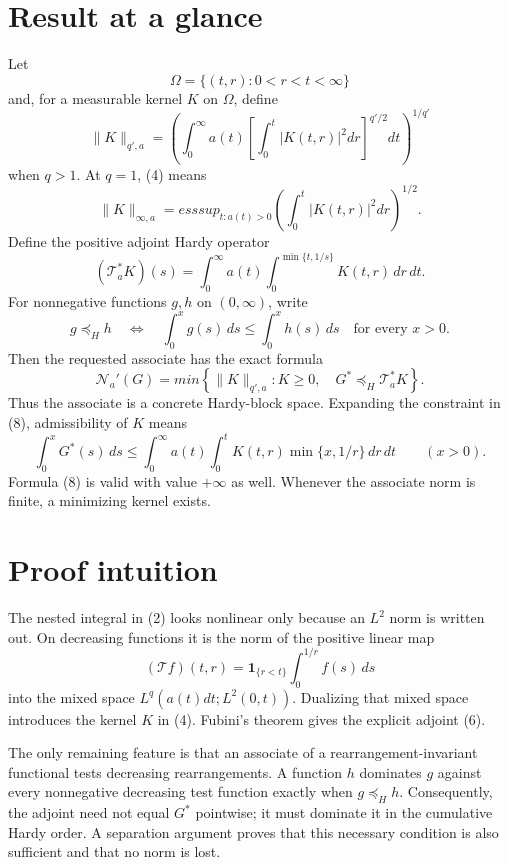 \documentclass[11pt]{article}
\newcommand{\N}{\mathcal N}
\newcommand{\T}{\mathcal T}
\begin{document}
\section*{Result at a glance}

Let
\[
 \Omega=\{(t,r):0<r<t<\infty\}
\]
and, for a measurable kernel $K$ on $\Omega$, define
\[
 \|K\|_{q',a}=
 \left(\int_0^\infty a(t)
       \left[\int_0^t |K(t,r)|^2dr\right]^{q'/2}dt\right)^{1/q'}
                                                                  \tag{4}
\]
when $q>1$.  At $q=1$, (4) means
\[
 \|K\|_{\infty,a}=esssup_{t:a(t)>0}
       \left(\int_0^t|K(t,r)|^2dr\right)^{1/2}.                 \tag{5}
\]
Define the positive adjoint Hardy operator
\[
 (\T_a^*K)(s)=
 \int_0^\infty a(t)
 \int_0^{\min\{t,1/s\}}K(t,r)\,dr\,dt.                         \tag{6}
\]
For nonnegative functions $g,h$ on $(0,\infty)$, write
\[
 g\preccurlyeq_H h
 \quad\Longleftrightarrow\quad
 \int_0^xg(s)\,ds\le\int_0^xh(s)\,ds
 \quad\text{for every }x>0.                                   \tag{7}
\]
Then the requested associate has the exact formula
\[
 \boxed{
 \N_a'(G)=min\left\{\|K\|_{q',a}:
 K\ge0,\quad G^*\preccurlyeq_H\T_a^*K\right\}.}              \tag{8}
\]
Thus the associate is a concrete Hardy-block space.  Expanding the constraint
in (8), admissibility of $K$ means
\[
 \int_0^xG^*(s)\,ds
 \le
 \int_0^\infty a(t)\int_0^t
        K(t,r)\min\{x,1/r\}\,dr\,dt
 \qquad(x>0).                                                   \tag{9}
\]
Formula (8) is valid with value $+\infty$ as well.  Whenever the associate
norm is finite, a minimizing kernel exists.

\section*{Proof intuition}

The nested integral in (2) looks nonlinear only because an $L^2$ norm is
written out.  On decreasing functions it is the norm of the positive linear
map
\[
 (\T f)(t,r)=\mathbf 1_{\{r<t\}}\int_0^{1/r}f(s)\,ds
\]
into the mixed space $L^q(a(t)dt;L^2(0,t))$.  Dualizing that mixed space
introduces the kernel $K$ in (4).  Fubini's theorem gives the explicit
adjoint (6).

The only remaining feature is that an associate of a rearrangement-invariant
functional tests decreasing rearrangements.  A function $h$ dominates $g$
against every nonnegative decreasing test function exactly when
$g\preccurlyeq_Hh$.  Consequently, the adjoint need not equal $G^*$
pointwise; it must dominate it in the cumulative Hardy order.  A separation
argument proves that this necessary condition is also sufficient and that no
norm is lost.
\end{document}

